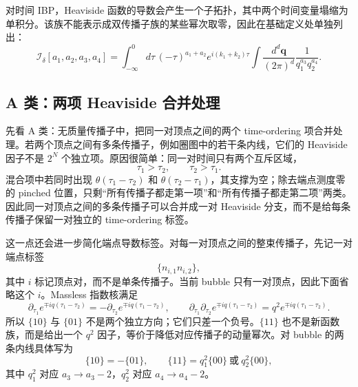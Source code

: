 ﻿\documentclass[a4paper,11pt]{article}
\begin{document}
对时间 IBP，Heaviside 函数的导数会产生一个子拓扑，其中两个时间变量塌缩为单积分。该族不能表示成双传播子族的某些幂次取零，因此在基础定义处单独列出：
\begin{equation}
    \mathcal{I}_{\delta}[a_1,a_2,a_3,a_4]=\int_{-\infty}^{0}d\tau\,(-\tau)^{a_1+a_2}
    e^{i(k_1+k_2)\tau}\int\frac{d^d\boldsymbol{q}}{(2\pi)^d}\frac{1}{q_1^{a_3}q_2^{a_4}}.
\end{equation}

\subsection{A 类：两项 Heaviside 合并处理}

先看 A 类：无质量传播子中，把同一对顶点之间的两个 time-ordering 项合并处理。若两个顶点之间有多条传播子，例如圈图中的若干条内线，它们的 Heaviside 因子不是 $2^N$ 个独立项。原因很简单：同一对时间只有两个互斥区域，
\begin{equation}
    \tau_1>\tau_2,\qquad \tau_2>\tau_1.
\end{equation}
混合项中若同时出现 $\theta(\tau_1-\tau_2)$ 和 $\theta(\tau_2-\tau_1)$，其支撑为空；除去端点测度零的 pinched 位置，只剩“所有传播子都走第一项”和“所有传播子都走第二项”两类。因此同一对顶点之间的多条传播子可以合并成一对 Heaviside 分支，而不是给每条传播子保留一对独立的 time-ordering 标签。

这一点还会进一步简化端点导数标签。对每一对顶点之间的整束传播子，先记一对端点标签
\begin{equation}
    \{n_{i,1}n_{i,2}\},
\end{equation}
其中 $i$ 标记顶点对，而不是单条传播子。当前 bubble 只有一对顶点，因此下面省略这个 $i$。Massless 指数核满足
\begin{equation}
    \partial_{\tau_1}e^{\mp iq(\tau_1-\tau_2)}
    =
    -\partial_{\tau_2}e^{\mp iq(\tau_1-\tau_2)},\qquad
    \partial_{\tau_1}\partial_{\tau_2}e^{\mp iq(\tau_1-\tau_2)}
    =
    q^2 e^{\mp iq(\tau_1-\tau_2)}.
\end{equation}
所以 $\{10\}$ 与 $\{01\}$ 不是两个独立方向；它们只差一个负号。$\{11\}$ 也不是新函数族，而是给出一个 $q^2$ 因子，等价于降低对应传播子的动量幂次。对 bubble 的两条内线具体写为
\begin{equation}
    \{10\}=-\{01\},\qquad
    \{11\}=q_1^2\{00\}\ \text{或}\ q_2^2\{00\},
\end{equation}
其中 $q_1^2$ 对应 $a_3\to a_3-2$，$q_2^2$ 对应 $a_4\to a_4-2$。
\end{document}
